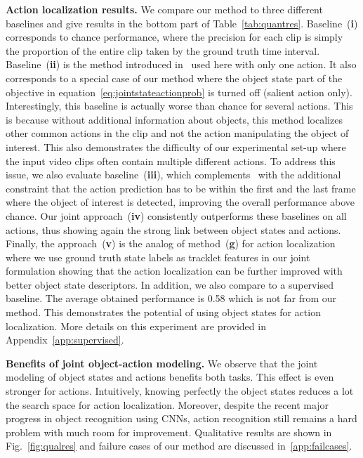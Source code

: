 \noindent\textbf{Action localization results.}
We compare our method to three different baselines and give results in the bottom part of Table~\ref{tab:quantres}.
Baseline~(\textbf{i}) corresponds to chance performance, where the precision for each clip is simply the proportion of the entire clip taken by the ground truth time interval.
Baseline~(\textbf{ii}) is the method introduced in~\cite{Bojanowski15weakly} used here with only one action. It also corresponds to a special case of our method where the object state part of the objective in equation~\eqref{eq:jointstateactionprob} is turned off (salient action only).
Interestingly, this baseline is actually worse than chance for several actions. This is because without additional information about objects, this method localizes  other common actions in the clip and not the action manipulating the object of interest. This also demonstrates the difficulty of our experimental set-up where the input video clips often contain multiple different actions.
%
%
To address this issue, we also evaluate baseline~(\textbf{iii}), which complements~\cite{Bojanowski15weakly} with the additional constraint that the action prediction has to be within the first and the last frame where the object of interest is detected, improving the overall performance above chance.
%
Our joint approach~(\textbf{iv}) consistently outperforms these baselines on all actions, thus showing again the strong link between object states and actions.
Finally, the approach~(\textbf{v}) is the analog of method~(\textbf{g}) for action localization where we use ground truth state labels as tracklet features in our joint formulation showing that the action localization can be further improved with better object state descriptors.
In addition, we also compare to a supervised baseline.
The average obtained performance is 0.58 which is not far from our method. 
This demonstrates the potential of using object states for action localization. 
More details on this experiment are provided in Appendix~\ref{app:supervised}.

\noindent\textbf{Benefits of joint object-action modeling.}
We observe that the joint modeling of object states and actions benefits both tasks.
This effect is even stronger for actions.  
Intuitively, knowing perfectly the object states reduces a lot the search space for action localization. 
Moreover, despite the recent major progress in object recognition using CNNs, action recognition still remains a hard problem with much room for improvement. 
Qualitative results are shown in Fig.~\ref{fig:qualres} and failure cases of our method are discussed in~\ref{app:failcases}.
	
